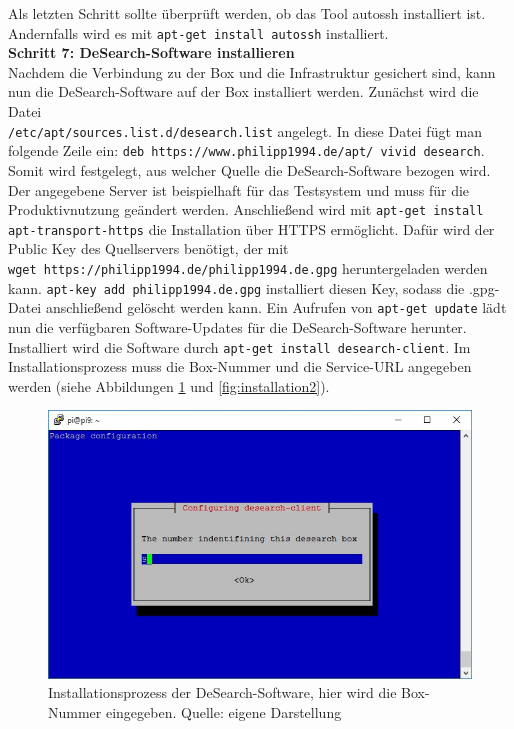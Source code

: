 Als letzten Schritt sollte überprüft werden, ob das Tool autossh installiert ist. Andernfalls wird es mit \texttt{apt-get install autossh} installiert.\\
\textbf{Schritt 7: DeSearch-Software installieren}\\
Nachdem die Verbindung zu der Box und die Infrastruktur gesichert sind, kann nun die DeSearch-Software auf der Box installiert werden. Zunächst wird die Datei\\ \texttt{/etc/apt/sources.list.d/desearch.list} angelegt. In diese Datei fügt man folgende Zeile ein: \texttt{deb https://www.philipp1994.de/apt/ vivid desearch}. Somit wird festgelegt, aus welcher Quelle die DeSearch-Software bezogen wird. Der angegebene Server ist beispielhaft für das Testsystem und muss für die Produktivnutzung geändert werden. Anschließend wird mit \texttt{apt-get install apt-transport-https} die Installation über HTTPS ermöglicht. Dafür wird der Public Key des Quellservers benötigt, der mit\\ \texttt{wget https://philipp1994.de/philipp1994.de.gpg} heruntergeladen werden kann. \texttt{apt-key add philipp1994.de.gpg} installiert diesen Key, sodass die .gpg-Datei anschließend gelöscht werden kann. Ein Aufrufen von \texttt{apt-get update} lädt nun die verfügbaren Software-Updates für die DeSearch-Software herunter. Installiert wird die Software durch \texttt{apt-get install desearch-client}. Im Installationsprozess muss die Box-Nummer und die Service-URL angegeben werden (siehe Abbildungen \ref{fig:installation1} und \ref{fig:installation2}).
\begin{figure}
	\centering
	\includegraphics[width=\textwidth]{images/installation1}
	\caption[Eingabe der Box-Nummer bei Installation der DeSearch-Software]{Installationsprozess der DeSearch-Software, hier wird die Box-Nummer eingegeben. Quelle: eigene Darstellung}
	\label{fig:installation1}
\end{figure}
